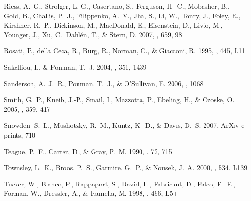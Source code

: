 \documentclass[12pt,preprint]{aastex}
\begin{document}
\begin{thebibliography}{}
{Riess}, A.~G., {Strolger}, L.-G., {Casertano}, S., {Ferguson}, H.~C.,
  {Mobasher}, B., {Gold}, B., {Challis}, P.~J., {Filippenko}, A.~V., {Jha}, S.,
  {Li}, W., {Tonry}, J., {Foley}, R., {Kirshner}, R.~P., {Dickinson}, M.,
  {MacDonald}, E., {Eisenstein}, D., {Livio}, M., {Younger}, J., {Xu}, C.,
  {Dahl{\'e}n}, T., \& {Stern}, D. 2007, \apj, 659, 98

{Rosati}, P., {della Ceca}, R., {Burg}, R., {Norman}, C., \& {Giacconi}, R.
  1995, \apjl, 445, L11

{Sakelliou}, I., \& {Ponman}, T.~J. 2004, \mnras, 351, 1439

{Sanderson}, A.~J.~R., {Ponman}, T.~J., \& {O'Sullivan}, E. 2006, \mnras, 1068

{Smith}, G.~P., {Kneib}, J.-P., {Smail}, I., {Mazzotta}, P., {Ebeling}, H., \&
  {Czoske}, O. 2005, \mnras, 359, 417

{Snowden}, S.~L., {Mushotzky}, R.~M., {Kuntz}, K.~D., \& {Davis}, D.~S. 2007,
  ArXiv e-prints, 710

{Teague}, P.~F., {Carter}, D., \& {Gray}, P.~M. 1990, \apjs, 72, 715

{Townsley}, L.~K., {Broos}, P.~S., {Garmire}, G.~P., \& {Nousek}, J.~A. 2000,
  \apjl, 534, L139

{Tucker}, W., {Blanco}, P., {Rappoport}, S., {David}, L., {Fabricant}, D.,
  {Falco}, E.~E., {Forman}, W., {Dressler}, A., \& {Ramella}, M. 1998, \apjl,
  496, L5+


\end{thebibliography}
\end{document}
